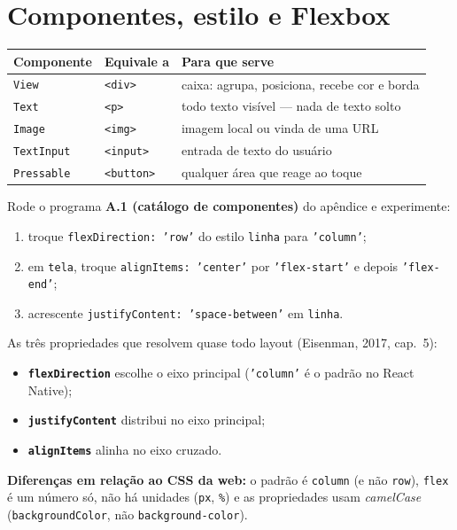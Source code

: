 \documentclass[11pt,a4paper]{article}
\newcommand{\cod}[1]{\texttt{#1}}
\newcommand{\caixa}{\(\square\)}
\begin{document}
\section{Componentes, estilo e Flexbox}

\begin{tabularx}{\linewidth}{@{}l l X@{}}
\toprule
\textbf{Componente} & \textbf{Equivale a} & \textbf{Para que serve} \\
\midrule
\cod{View} & \cod{<div>} & caixa: agrupa, posiciona, recebe cor e borda \\
\cod{Text} & \cod{<p>} & todo texto visível --- nada de texto solto \\
\cod{Image} & \cod{<img>} & imagem local ou vinda de uma URL \\
\cod{TextInput} & \cod{<input>} & entrada de texto do usuário \\
\cod{Pressable} & \cod{<button>} & qualquer área que reage ao toque \\
\bottomrule
\end{tabularx}

Rode o programa \textbf{A.1 (catálogo de componentes)} do apêndice e experimente:
\begin{enumerate}[label=\caixa]
  \item troque \cod{flexDirection: 'row'} do estilo \cod{linha} para \cod{'column'};
  \item em \cod{tela}, troque \cod{alignItems: 'center'} por \cod{'flex-start'} e depois \cod{'flex-end'};
  \item acrescente \cod{justifyContent: 'space-between'} em \cod{linha}.
\end{enumerate}

As três propriedades que resolvem quase todo layout (Eisenman, 2017, cap.~5):
\begin{itemize}
  \item \textbf{\cod{flexDirection}} escolhe o eixo principal (\cod{'column'} é o padrão no React Native);
  \item \textbf{\cod{justifyContent}} distribui no eixo principal;
  \item \textbf{\cod{alignItems}} alinha no eixo cruzado.
\end{itemize}

\begin{aviso}
\textbf{Diferenças em relação ao CSS da web:} o padrão é \cod{column} (e não \cod{row}),
\cod{flex} é um número só, não há unidades (\cod{px}, \cod{\%}) e as propriedades usam
\emph{camelCase} (\cod{backgroundColor}, não \cod{background-color}).
\end{aviso}
\end{document}
